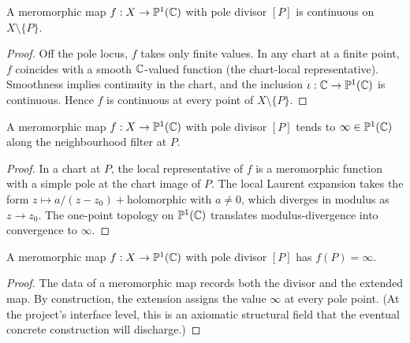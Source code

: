 \begin{lemma}
\label{lem:meromorphic-continuous-off-pole}
A meromorphic map \(f:X\to\mathbb{P}^{1}(\mathbb{C})\) with pole divisor \([P]\) is
continuous on \(X\setminus\{P\}\).
\leanok
\end{lemma}
\begin{proof}\leanok
Off the pole locus, \(f\) takes only finite values. In any chart at
a finite point, \(f\) coincides with a smooth \(\mathbb{C}\)-valued
function (the chart-local representative). Smoothness implies
continuity in the chart, and the inclusion \(\iota:\mathbb{C}\to\mathbb{P}^{1}(\mathbb{C})\) is
continuous. Hence \(f\) is continuous at every point of
\(X\setminus\{P\}\).
\end{proof}

\begin{lemma}
\label{lem:meromorphic-tends-to-infty-at-simple-pole}
A meromorphic map \(f:X\to\mathbb{P}^{1}(\mathbb{C})\) with pole divisor \([P]\) tends
to \(\infty\in\mathbb{P}^{1}(\mathbb{C})\) along the neighbourhood filter at \(P\).
\leanok
\end{lemma}
\begin{proof}\leanok
In a chart at \(P\), the local representative of \(f\) is a
meromorphic function with a simple pole at the chart image of \(P\).
The local Laurent expansion takes the form
\(z\mapsto a/(z-z_{0})+\text{holomorphic}\) with \(a\neq 0\), which
diverges in modulus as \(z\to z_{0}\). The one-point topology on
\(\mathbb{P}^{1}(\mathbb{C})\) translates modulus-divergence into convergence to
\(\infty\).
\end{proof}

\begin{lemma}
\label{lem:meromorphic-value-at-pole}

A meromorphic map \(f:X\to\mathbb{P}^{1}(\mathbb{C})\) with pole divisor \([P]\) has
\(f(P)=\infty\).
\leanok
\end{lemma}
\begin{proof}\leanok
The data of a meromorphic map records both the divisor and the
extended map. By construction, the extension assigns the value
\(\infty\) at every pole point. (At the project's interface level,
this is an axiomatic structural field that the eventual concrete
construction will discharge.)
\end{proof}

